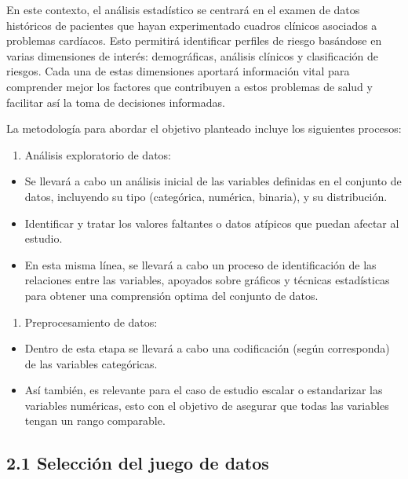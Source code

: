 \documentclass[
]{article}
\providecommand{\tightlist}{%
  \setlength{\itemsep}{0pt}\setlength{\parskip}{0pt}}
\begin{document}
En este contexto, el análisis estadístico se centrará en el examen de
datos históricos de pacientes que hayan experimentado cuadros clínicos
asociados a problemas cardíacos. Esto permitirá identificar perfiles de
riesgo basándose en varias dimensiones de interés: demográficas,
análisis clínicos y clasificación de riesgos. Cada una de estas
dimensiones aportará información vital para comprender mejor los
factores que contribuyen a estos problemas de salud y facilitar así la
toma de decisiones informadas.

La metodología para abordar el objetivo planteado incluye los siguientes
procesos:

\begin{enumerate}
\def\labelenumi{\alph{enumi}.}
\tightlist
\item
  Análisis exploratorio de datos:
\end{enumerate}

\begin{itemize}
\tightlist
\item
  Se llevará a cabo un análisis inicial de las variables definidas en el
  conjunto de datos, incluyendo su tipo (categórica, numérica, binaria),
  y su distribución.
\item
  Identificar y tratar los valores faltantes o datos atípicos que puedan
  afectar al estudio.
\item
  En esta misma línea, se llevará a cabo un proceso de identificación de
  las relaciones entre las variables, apoyados sobre gráficos y técnicas
  estadísticas para obtener una comprensión optima del conjunto de
  datos.
\end{itemize}

\begin{enumerate}
\def\labelenumi{\alph{enumi}.}
\setcounter{enumi}{1}
\tightlist
\item
  Preprocesamiento de datos:
\end{enumerate}

\begin{itemize}
\tightlist
\item
  Dentro de esta etapa se llevará a cabo una codificación (según
  corresponda) de las variables categóricas.
\item
  Así también, es relevante para el caso de estudio escalar o
  estandarizar las variables numéricas, esto con el objetivo de asegurar
  que todas las variables tengan un rango comparable.
\end{itemize}

\hypertarget{selecciuxf3n-del-juego-de-datos}{%
\subsection{2.1 Selección del juego de
datos}\label{selecciuxf3n-del-juego-de-datos}}
\end{document}
